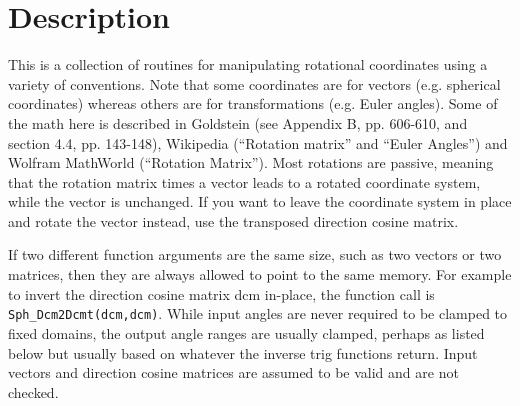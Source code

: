 \documentclass[11pt]{article}
\newcommand {\ttt} {\texttt}
\begin{document}
\section{Description}

This is a collection of routines for manipulating rotational coordinates using a variety of conventions. Note that some coordinates are for vectors (e.g. spherical coordinates) whereas others are for transformations (e.g. Euler angles). Some of the math here is described in Goldstein (see Appendix B, pp. 606-610, and section 4.4, pp. 143-148), Wikipedia (``Rotation matrix'' and ``Euler Angles'') and Wolfram MathWorld (``Rotation Matrix''). Most rotations are passive, meaning that the rotation matrix times a vector leads to a rotated coordinate system, while the vector is unchanged. If you want to leave the coordinate system in place and rotate the vector instead, use the transposed direction cosine matrix.

If two different function arguments are the same size, such as two vectors or two matrices, then they are always allowed to point to the same memory. For example to invert the direction cosine matrix dcm in-place, the function call is \ttt{Sph\_Dcm2Dcmt(dcm,dcm)}. While input angles are never required to be clamped to fixed domains, the output angle ranges are usually clamped, perhaps as listed below but usually based on whatever the inverse trig functions return. Input vectors and direction cosine matrices are assumed to be valid and are not checked.
\end{document}
